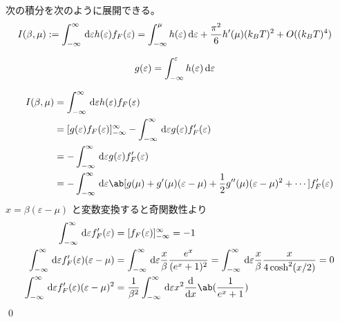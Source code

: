 \documentclass[uplatex,diffipdfmx,a4paper,11pt]{jlreq}
\makeatletter
\theoremstyle{definition}
\renewenvironment{proof}[1][\proofname]{\par
  \normalfont
  \topsep6\p@\@plus6\p@ \trivlist
  \item[\hskip\labelsep{\bfseries #1}\@addpunct{\bfseries}]\ignorespaces\quad\par
}{%
  \qed\endtrivlist\@endpefalse
}
\renewcommand\proofname{証明}
\makeatother
\begin{document}
\begin{theorem}[ゾンマーフェルト展開]
  次の積分を次のように展開できる。
  \begin{align}
    I(\beta, \mu) & := \int_{-\infty}^{\infty}\dl{\varepsilon}h(\varepsilon)f_F(\varepsilon) = \int_{-\infty}^\mu h(\varepsilon)\dl{\varepsilon} + \frac{\pi^2}{6}h'(\mu)(k_BT)^2 + O((k_BT)^{4})
  \end{align}
\end{theorem}
\begin{proof}
  \begin{align}
    g(\varepsilon) & = \int_{-\infty}^\varepsilon h(\varepsilon)\dl{\varepsilon}
  \end{align}

  \begin{align}
    I(\beta, \mu) & = \int_{-\infty}^{\infty}\dl{\varepsilon}h(\varepsilon)f_F(\varepsilon)                                                                                  \\
                  & = [g(\varepsilon)f_F(\varepsilon)]_{-\infty}^{\infty} - \int_{-\infty}^{\infty}\dl{\varepsilon}g(\varepsilon)f_F'(\varepsilon)                           \\
                  & = - \int_{-\infty}^{\infty}\dl{\varepsilon}g(\varepsilon)f_F'(\varepsilon)                                                                               \\
                  & = - \int_{-\infty}^{\infty}\dl{\varepsilon}\ab[g(\mu) + g'(\mu)(\varepsilon - \mu) + \frac{1}{2}g''(\mu)(\varepsilon - \mu)^2 + \cdots]f_F'(\varepsilon)
  \end{align}
  $x = \beta(\varepsilon - \mu)$ と変数変換すると奇関数性より
  \begin{align}
    \int_{-\infty}^{\infty}\dl{\varepsilon}f_F'(\varepsilon)                      & = [f_F(\varepsilon)]_{-\infty}^{\infty} = -1                                                                                                                        \\
    \int_{-\infty}^{\infty}\dl{\varepsilon}f_F'(\varepsilon)(\varepsilon - \mu)   & = \int_{-\infty}^{\infty}\dl{\varepsilon}\frac{x}{\beta}\frac{e^x}{(e^x + 1)^2} = \int_{-\infty}^{\infty}\dl{\varepsilon}\frac{x}{\beta}\frac{x}{4\cosh^2(x/2)} = 0 \\
    \int_{-\infty}^{\infty}\dl{\varepsilon}f_F'(\varepsilon)(\varepsilon - \mu)^2 & = \frac{1}{\beta^2}\int_{-\infty}^{\infty}\dl{\varepsilon}x^2\diff{}{x}\ab(\frac{1}{e^x + 1})                                                                       \\

\end{align}
\end{proof}
\end{document}
